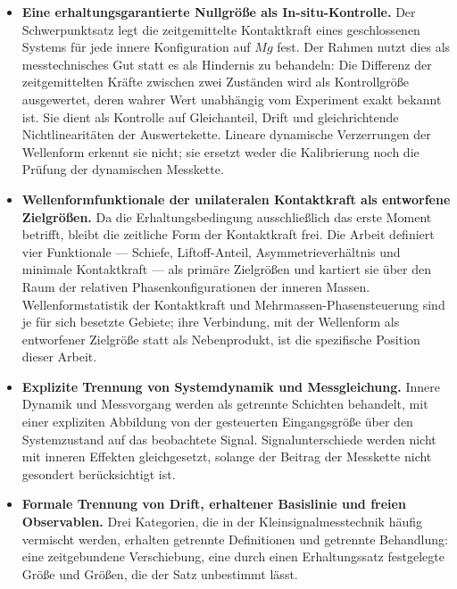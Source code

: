 \documentclass[12pt,a4paper]{report}
\begin{document}
\begin{itemize}

  \item \textbf{Eine erhaltungsgarantierte Nullgröße als In-situ-Kontrolle.}
        Der Schwerpunktsatz legt die zeitgemittelte Kontaktkraft eines
        geschlossenen Systems für jede innere Konfiguration auf $Mg$
        fest. Der Rahmen nutzt dies als messtechnisches Gut statt es als
        Hindernis zu behandeln: Die Differenz der zeitgemittelten Kräfte
        zwischen zwei Zuständen wird als Kontrollgröße ausgewertet, deren
        wahrer Wert unabhängig vom Experiment exakt bekannt ist. Sie
        dient als Kontrolle auf Gleichanteil, Drift und gleichrichtende
        Nichtlinearitäten der Auswertekette. Lineare dynamische
        Verzerrungen der Wellenform erkennt sie nicht; sie ersetzt weder
        die Kalibrierung noch die Prüfung der dynamischen Messkette.

  \item \textbf{Wellenformfunktionale der unilateralen Kontaktkraft als
        entworfene Zielgrößen.}
        Da die Erhaltungsbedingung ausschließlich das erste Moment
        betrifft, bleibt die zeitliche Form der Kontaktkraft frei. Die
        Arbeit definiert vier Funktionale --- Schiefe, Liftoff-Anteil,
        Asymmetrieverhältnis und minimale Kontaktkraft --- als primäre
        Zielgrößen und kartiert sie über den Raum der relativen
        Phasenkonfigurationen der inneren Massen. Wellenformstatistik der
        Kontaktkraft und Mehrmassen-Phasensteuerung sind je für sich
        besetzte Gebiete; ihre Verbindung, mit der Wellenform als
        entworfener Zielgröße statt als Nebenprodukt, ist die spezifische
        Position dieser Arbeit.

  \item \textbf{Explizite Trennung von Systemdynamik und Messgleichung.}
        Innere Dynamik und Messvorgang werden als getrennte Schichten
        behandelt, mit einer expliziten Abbildung von der gesteuerten
        Eingangsgröße über den Systemzustand auf das beobachtete Signal.
        Signalunterschiede werden nicht mit inneren Effekten
        gleichgesetzt, solange der Beitrag der Messkette nicht gesondert
        berücksichtigt ist.

  \item \textbf{Formale Trennung von Drift, erhaltener Basislinie und
        freien Observablen.}
        Drei Kategorien, die in der Kleinsignalmesstechnik häufig
        vermischt werden, erhalten getrennte Definitionen und getrennte
        Behandlung: eine zeitgebundene Verschiebung, eine durch einen
        Erhaltungssatz festgelegte Größe und Größen, die der Satz
        unbestimmt lässt.


\end{itemize}
\end{document}
